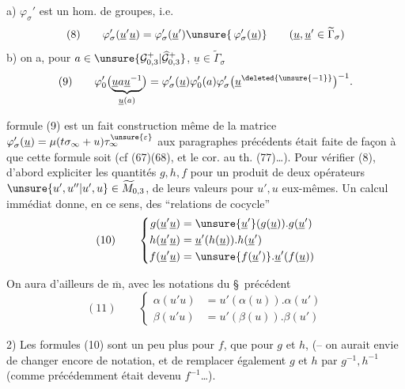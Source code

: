 a) $\varphi_\sigma'$ est un hom. de groupes, i.e.
\[
(8)\qquad\varphi_\sigma'(\underline u'\underline u)=\varphi_\sigma'(\underline u')\unsure{\,\varphi_\sigma'(\underline u)}\qquad(\underline u,\underline u'\in\widetilde\Gamma_\sigma)
\]
b) on a, pour $a\in\unsure{\mathcal G_{0,3}^{+}|\widehat{\mathcal G}_{0,3}^{+}}$, $\underline u\in\widetilde\Gamma_\sigma$
\[
(9)\qquad\varphi_0'\bigl(\underbrace{\underline u a\underline u^{-1}}_{\underline u(a)}\bigr)=\varphi_\sigma'(\underline u)\varphi_0'(a)\varphi_\sigma'\bigl(\underline u^{\deleted{\unsure{-1}}}\bigr)^{-1}.
\]

 formule (9) est un fait   construction même de la matrice $\varphi_\sigma'(\underline u)=\mu(t\sigma_\infty+u)\tau_\infty^{\unsure{\varepsilon}}$ aux paragraphes précédents était faite de façon à   que cette formule soit  (cf (67)(68), et le cor. au th. (77)\ldots). Pour vérifier (8),   d'abord expliciter les quantités $g,h,f$ pour un produit de deux opérateurs $\unsure{u',u''|u',u}\in\widetilde M_{0,3}$,  de leurs valeurs pour $u',u$ eux-mêmes. Un calcul immédiat donne, en ce sens, des ``relations de cocycle''
\[
(10)\qquad\left\{\begin{aligned}
g(\underline u'\underline u)&=\unsure{\underline u'}(g(\underline u)).g(\underline u')\\
h(\underline u'\underline u)&=\underline u'(h(\underline u)).h(\underline u')\\
f(\underline u'\underline u)&=\unsure{f(\underline u')}.\underline u'(f(\underline u))
\end{aligned}\right.
\]


 On aura d'ailleurs de $\overline{\mathrm m}$, avec les notations du \S\ précédent
\[
(11)\qquad\left\{\begin{aligned}
\alpha(u'u)&=u'(\alpha(u)).\alpha(u')\\
\beta(u'u)&=u'(\beta(u)).\beta(u')
\end{aligned}\right.
\]

 2) Les formules (10) sont un peu plus  pour $f$, que pour $g$ et $h$,  (-- on aurait envie de changer encore de notation, et de remplacer également $g$ et $h$ par $g^{-1},h^{-1}$ (comme précédemment  était devenu $f^{-1}$\ldots).

